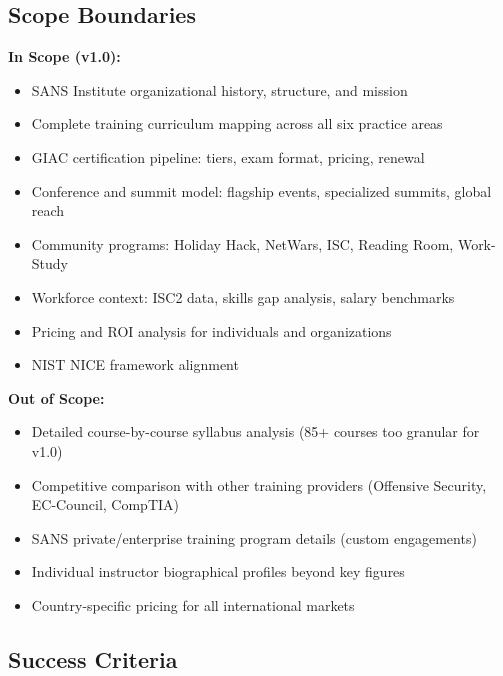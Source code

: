 \documentclass[11pt,letterpaper]{article}
\begin{document}
\subsection{Scope Boundaries}

\textbf{In Scope (v1.0):}
\begin{itemize}[nosep]
  \item SANS Institute organizational history, structure, and mission
  \item Complete training curriculum mapping across all six practice areas
  \item GIAC certification pipeline: tiers, exam format, pricing, renewal
  \item Conference and summit model: flagship events, specialized summits, global reach
  \item Community programs: Holiday Hack, NetWars, ISC, Reading Room, Work-Study
  \item Workforce context: ISC2 data, skills gap analysis, salary benchmarks
  \item Pricing and ROI analysis for individuals and organizations
  \item NIST NICE framework alignment
\end{itemize}

\textbf{Out of Scope:}
\begin{itemize}[nosep]
  \item Detailed course-by-course syllabus analysis (85+ courses too granular for v1.0)
  \item Competitive comparison with other training providers (Offensive Security, EC-Council, CompTIA)
  \item SANS private/enterprise training program details (custom engagements)
  \item Individual instructor biographical profiles beyond key figures
  \item Country-specific pricing for all international markets
\end{itemize}

\subsection{Success Criteria}
\end{document}
